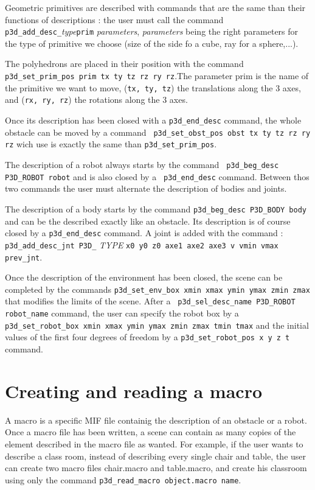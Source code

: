 Geometric primitives are described with commands that are the same
than their functions of descriptions : the user must call the command
{\tt p3d\_add\_desc\_}{\it type}{\tt prim} {\it parameters}, {\it
parameters} being the right parameters for the type of primitive we
choose (size of the side fo a cube, ray for a sphere,...).

The polyhedrons are placed in their position with the command {\tt
p3d\_set\_prim\_pos prim tx ty tz rz ry rz}.The parameter prim is the
name of the primitive we want to move, ({\tt tx, ty, tz}) the
translations along the 3 axes, and ({\tt rx, ry, rz}) the
rotations along the 3 axes.

Once its description has been closed with a {\tt p3d\_end\_desc}
command, the whole obstacle can be moved by a command {\tt
p3d\_set\_obst\_pos obst tx ty tz rz ry rz} wich use is
exactly the same than {\tt p3d\_set\_prim\_pos}.

The description of a robot always starts by the command {\tt
p3d\_beg\_desc P3D\_ROBOT robot} and is also closed by a {\tt
p3d\_end\_desc} command. Between thos two commands the user must
alternate the description of bodies and joints. 

The description of a body starts by the command {\tt p3d\_beg\_desc
P3D\_BODY body} and can be the described exactly like an obstacle. Its
description is of course closed by a {\tt p3d\_end\_desc} command. A
joint is added with the command : {\tt p3d\_add\_desc\_jnt P3D\_}{\it
TYPE} {\tt x0 y0 z0 axe1 axe2 axe3 v vmin vmax prev\_jnt}.

Once the description of the environment has been closed, the scene can
be completed by the commands {\tt p3d\_set\_env\_box xmin xmax ymin
ymax zmin zmax} that modifies the limits of the scene. After a {\tt
p3d\_sel\_desc\_name P3D\_ROBOT robot\_name} command, the user can
specify the robot box by a {\tt p3d\_set\_robot\_box xmin xmax ymin
ymax zmin zmax tmin tmax} and the initial values of the first four
degrees of freedom by a {\tt p3d\_set\_robot\_pos x y z t} command.

\section{Creating and reading a macro}

A macro is a specific MIF file containig the description of an
obstacle or a robot. Once a macro file has been written, a scene can
contain as many copies of the element described in the macro file as
wanted. For example, if the user wants to describe a class room,
instead of describing every single chair and table, the user can
create two macro files chair.macro and table.macro, and create his
classroom using only the command {\tt p3d\_read\_macro object.macro
name}.

